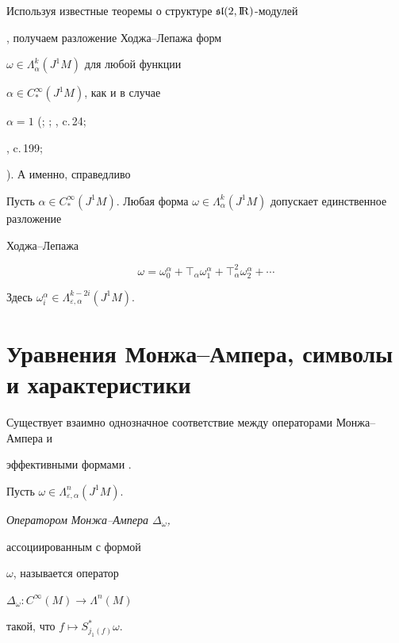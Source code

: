 Используя известные теоремы о структуре ${\frak s\frak l}(2,{\mathrm{I\!R}})$-модулей 


\cite{serre}, получаем разложение Ходжа--Лепажа форм 


$\omega \in \Lambda_\alpha^k(J^1M)$ для любой функции 


$\alpha \in C_{*}^\infty (J^1M)$, как и в случае 


$\alpha =1$ (\cite{lepage}; \cite{chern}; \cite{weil}, c.\,24;


\cite{wells}, c.\,199;


\cite{lychagin2}). А именно, справедливо





\begin{prop}


Пусть $\alpha \in C_{*}^\infty (J^1M).$ Любая форма $\omega \in


\Lambda_\alpha^k(J^1M)$ допускает единственное разложение


Ходжа--Лепажа


$$


\omega =\omega_0^\alpha +\top_\alpha \omega_1^\alpha +\top


_\alpha^2\omega_2^\alpha +\dotsb


$$


Здесь $\omega_i^\alpha \in \Lambda_{\varepsilon ,\alpha }^{k-2i}(J^1M)$.


\end{prop}





\section{Уравнения Монжа--Ампера, символы и характеристики}





Существует взаимно однозначное соответствие между операторами Монжа--Ампера и


эффективными формами {\cite{lychagin2}}.





\begin{defn}


Пусть $\omega \in \Lambda_{\varepsilon ,\alpha }^n(J^1M)$. 


{\em Оператором Монжа--Ампера $\Delta_\omega$, 


ассоциированным с формой} $\omega$, называется оператор


$\Delta_\omega :C^\infty (M)\to \Lambda^n(M)$


такой, что $f\mapsto S_{j_1(f)}^{*}\omega $.


\end{defn}





